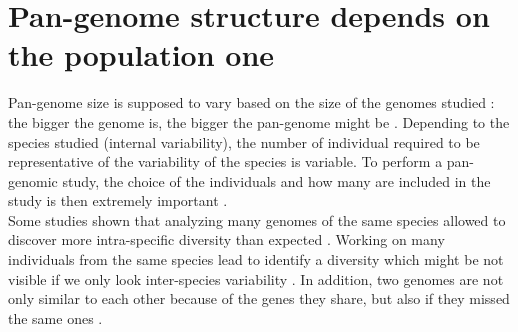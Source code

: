 \documentclass[a4paper,10pt,twoside]{report}
\begin{document}
\section{Pan-genome structure depends on the population one}
Pan-genome size is supposed to vary based on the size of the genomes studied \cite{Tatusov1997, Hogg2007, Hirsch2014}: the bigger the genome is, the bigger the pan-genome might be \cite{Tatusov1997,Hogg2007,Hirsch2014}. Depending to the species studied (internal variability), the number of individual required to be representative of the variability of the species is variable. To perform a pan-genomic study, the choice of the individuals and how many are included in the study is then extremely important \cite{Tatusov1997,Tettelin2005,Hogg2007,Tettelin2008}.\\

Some studies shown that analyzing many genomes of the same species allowed to discover more intra-specific diversity than expected \cite{Tettelin2008}. Working on many individuals from the same species lead to identify a diversity which might be not visible if we only look inter-species variability \cite{Lukjancenko2012}. In addition, two genomes are not only similar to each other because of the genes they share, but also if they missed the same ones \cite{Snipen2010}.\\


\end{document}
